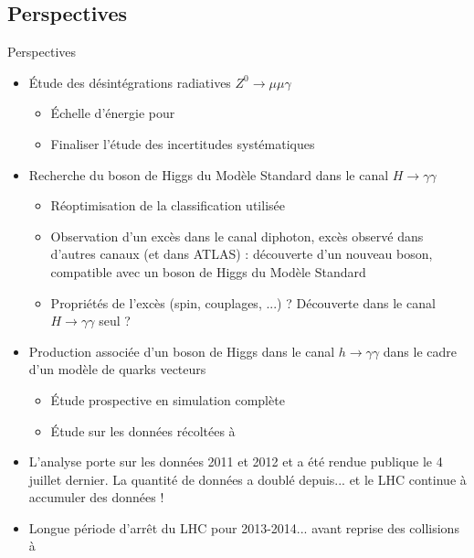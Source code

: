 \documentclass[usenames,dvipsnames]{beamer}
\begin{document}
\subsection{Perspectives}
\begin{frame}{Perspectives}
\vspace{-.3cm}
\begin{block}{}
\begin{itemize}\scriptsize
  \item Étude des désintégrations radiatives $Z^0\to\mu\mu\gamma$
  \begin{itemize}\scriptsize
    \item Échelle d'énergie pour 
    \item Finaliser l'étude des incertitudes systématiques
  \end{itemize}
  \item Recherche du boson de Higgs du Modèle Standard dans le canal $H\to\gamma\gamma$
  \begin{itemize}\scriptsize
    \item Réoptimisation de la classification utilisée
    \item Observation d'un excès dans le canal diphoton, excès observé dans d'autres canaux (et dans ATLAS) : découverte d'un nouveau boson, compatible avec un boson de Higgs du Modèle Standard
    \item Propriétés de l'excès (spin, couplages, ...) ? Découverte dans le canal $H\to\gamma\gamma$ seul ?
  \end{itemize}
  \item Production associée d'un boson de Higgs dans le canal $h\to\gamma\gamma$ dans le cadre d'un modèle de quarks vecteurs
  \begin{itemize}\scriptsize
    \item Étude prospective en simulation complète
    \item Étude sur les données récoltées à 
  \end{itemize}
\end{itemize}
\end{block}
\vspace{-.1cm}

\begin{block}{}
\begin{itemize}\scriptsize
\item L'analyse porte sur les données 2011 et 2012 et a été rendue publique le 4 juillet dernier. La quantité de données a doublé depuis... et le LHC continue à accumuler des données !
\item Longue période d'arrêt du LHC pour 2013-2014... avant reprise des collisions à 
\end{itemize}
\end{block}
\end{frame}
\end{document}
